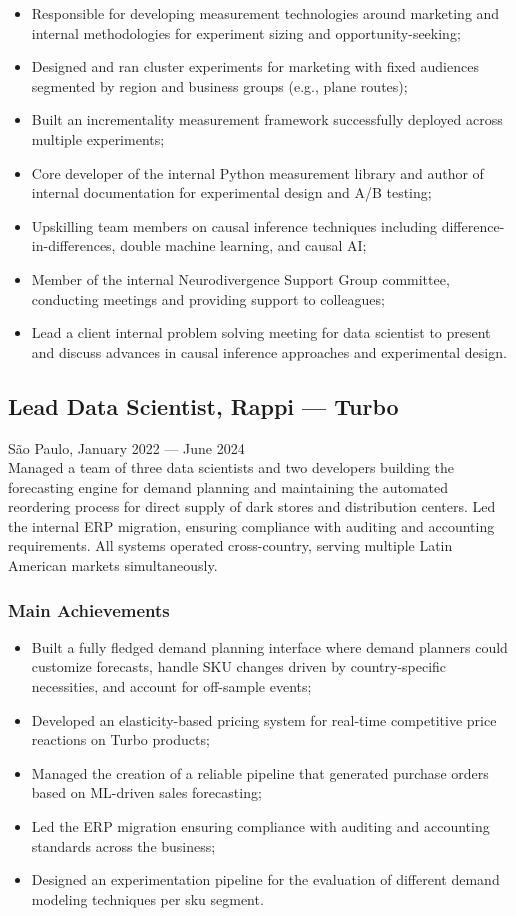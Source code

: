 \documentclass{article}
\newcommand{\jobdate}[3]{
\large
\vspace{0.05em} 
  {#1, #2 --- #3}
\vspace{0.5em} 
\\
}
\begin{document}
\begin{itemize}
\item{Responsible for developing measurement technologies around marketing and internal methodologies for experiment sizing and opportunity-seeking;}
\item{Designed and ran cluster experiments for marketing with fixed audiences segmented by region and business groups (e.g., plane routes);}
\item{Built an incrementality measurement framework successfully deployed across multiple experiments;}
\item{Core developer of the internal Python measurement library and author of internal documentation for experimental design and A/B testing;}
\item{Upskilling team members on causal inference techniques including difference-in-differences, double machine learning, and causal AI;}
\item{Member of the internal Neurodivergence Support Group committee, conducting meetings and providing support to colleagues;}
\item{Lead a client internal problem solving meeting for data scientist to present and discuss advances in causal inference approaches and experimental design.}
\end{itemize}

\subsection{Lead Data Scientist, Rappi --- Turbo}
\jobdate{São Paulo}{January 2022}{June 2024}
Managed a team of three data scientists and two developers building the forecasting engine for demand planning and maintaining the automated reordering process for direct supply of dark stores and distribution centers. Led the internal ERP migration, ensuring compliance with auditing and accounting requirements. All systems operated cross-country, serving multiple Latin American markets simultaneously.
\subsubsection{Main Achievements}

\begin{itemize}
\item{Built a fully fledged demand planning interface where demand planners could customize forecasts, handle SKU changes driven by country-specific necessities, and account for off-sample events;}
\item{Developed an elasticity-based pricing system for real-time competitive price reactions on Turbo products;}
\item{Managed the creation of a reliable pipeline that generated purchase orders based on ML-driven sales forecasting;}
\item{Led the ERP migration ensuring compliance with auditing and accounting standards across the business;}
\item{Designed an experimentation pipeline for the evaluation of different demand modeling techniques per sku segment.}
\end{itemize}
\end{document}
